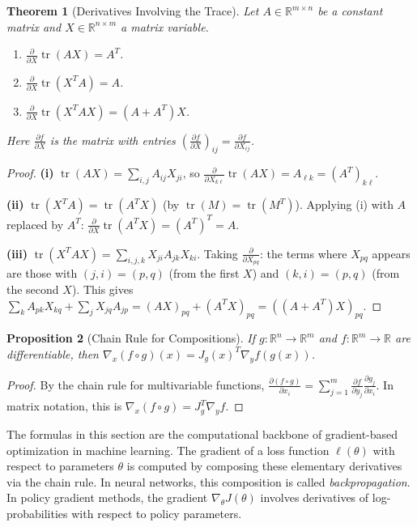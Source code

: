 \documentclass[11pt,a4paper]{article}
\theoremstyle{definition}
\theoremstyle{plain}
\newtheorem{theorem}{Theorem}[section]
\newtheorem{proposition}[theorem]{Proposition}
\theoremstyle{remark}
\newcommand{\R}{\mathbb{R}}
\DeclareMathOperator{\tr}{tr}
\begin{document}
\begin{theorem}[Derivatives Involving the Trace]
\label{thm:trace_derivatives}
Let $A \in \R^{m \times n}$ be a constant matrix and $X \in \R^{n \times m}$ a matrix variable.
\begin{enumerate}[nosep,label=(\roman*)]
    \item $\frac{\partial}{\partial X} \tr(AX) = A^T$.
    \item $\frac{\partial}{\partial X} \tr(X^T A) = A$.
    \item $\frac{\partial}{\partial X} \tr(X^T A X) = (A + A^T)X$.
\end{enumerate}
Here $\frac{\partial f}{\partial X}$ is the matrix with entries
$\left(\frac{\partial f}{\partial X}\right)_{ij} = \frac{\partial f}{\partial X_{ij}}$.
\end{theorem}

\begin{proof}
\textbf{(i)} $\tr(AX) = \sum_{i,j} A_{ij} X_{ji}$, so
$\frac{\partial}{\partial X_{k\ell}} \tr(AX) = A_{\ell k} = (A^T)_{k\ell}$.

\textbf{(ii)} $\tr(X^T A) = \tr(A^T X)$ (by $\tr(M) = \tr(M^T)$). Applying (i) with
$A$ replaced by $A^T$: $\frac{\partial}{\partial X} \tr(A^T X) = (A^T)^T = A$.

\textbf{(iii)} $\tr(X^T A X) = \sum_{i,j,k} X_{ji} A_{jk} X_{ki}$. Taking
$\frac{\partial}{\partial X_{pq}}$: the terms where $X_{pq}$ appears are those with
$(j, i) = (p, q)$ (from the first $X$) and $(k, i) = (p, q)$ (from the second $X$). This
gives $\sum_k A_{pk} X_{kq} + \sum_j X_{jq} A_{jp} = (AX)_{pq} + (A^T X)_{pq}
= ((A + A^T)X)_{pq}$.
\end{proof}

\begin{proposition}[Chain Rule for Compositions]
\label{prop:chain_rule}
If $g: \R^n \to \R^m$ and $f: \R^m \to \R$ are differentiable, then
$\nabla_x (f \circ g)(x) = J_g(x)^T \nabla_y f(g(x))$.
\end{proposition}

\begin{proof}
By the chain rule for multivariable functions,
$\frac{\partial (f \circ g)}{\partial x_i} = \sum_{j=1}^m \frac{\partial f}{\partial y_j}
\frac{\partial g_j}{\partial x_i}$. In matrix notation, this is
$\nabla_x(f \circ g) = J_g^T \nabla_y f$.
\end{proof}

\begin{keyresult}
The formulas in this section are the computational backbone of gradient-based optimization in
machine learning. The gradient of a loss function $\ell(\theta)$ with respect to parameters
$\theta$ is computed by composing these elementary derivatives via the chain rule. In neural
networks, this composition is called \emph{backpropagation}. In policy gradient methods, the
gradient $\nabla_\theta J(\theta)$ involves derivatives of log-probabilities with respect to
policy parameters.
\end{keyresult}
\end{document}
